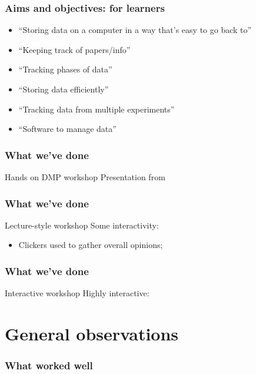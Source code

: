 \begin{frame}
  \frametitle{Aims and objectives: for learners}
  
  \begin{itemize}[<+>]
    \item ``Storing data on a computer in a way that's easy to go back to''
    \item ``Keeping track of papers/info''
    \item ``Tracking phases of data''
    \item ``Storing data efficiently''
    \item ``Tracking data from multiple experiments''
    \item ``Software to manage data''
  \end{itemize}

\end{frame}

\begin{frame}
  \frametitle{What we've done}
  
  \begin{block}{Hands on DMP workshop}
    Presentation from 
  \end{block}
\end{frame}

\begin{frame}
  \frametitle{What we've done}
  
  \begin{block}{Lecture-style workshop}
    Some interactivity:
    \begin{itemize}
      \item Clickers used to gather overall opinions;
    \end{itemize}
  \end{block}
\end{frame}

\begin{frame}
  \frametitle{What we've done}
  
  \begin{block}{Interactive workshop}
    Highly interactive:
  \end{block}
\end{frame}
\section{General observations}

\begin{frame}
  \frametitle{What worked well}
  

\end{frame}

